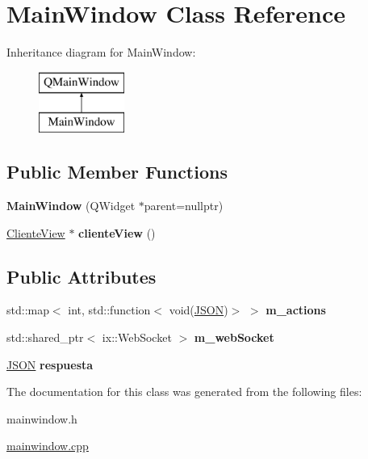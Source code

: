 \hypertarget{classMainWindow}{}\section{Main\+Window Class Reference}
\label{classMainWindow}
Inheritance diagram for Main\+Window\+:\begin{figure}[H]
\begin{center}
\leavevmode
\includegraphics[height=2.000000cm]{classMainWindow}
\end{center}
\end{figure}
\subsection*{Public Member Functions}
\begin{DoxyCompactItemize}
\item 
\mbox{\label{classMainWindow_a996c5a2b6f77944776856f08ec30858d}} 
{\bfseries Main\+Window} (Q\+Widget $\ast$parent=nullptr)
\item 
\mbox{\label{classMainWindow_a61945ee5853009d3409addb1b3d5158d}} 
\mbox{\hyperlink{classClienteView}{Cliente\+View}} $\ast$ {\bfseries cliente\+View} ()
\end{DoxyCompactItemize}
\subsection*{Public Attributes}
\begin{DoxyCompactItemize}
\item 
\mbox{\label{classMainWindow_adbf05482eab51a08599d3a89122638c5}} 
std\+::map$<$ int, std\+::function$<$ void(\mbox{\hyperlink{cliente_8cpp_ab6104b89642419db4e355b7b2e40abbe}{J\+S\+ON}})$>$ $>$ {\bfseries m\+\_\+actions}
\item 
\mbox{\label{classMainWindow_afa2b6b62c93689faa60806203384987a}} 
std\+::shared\+\_\+ptr$<$ ix\+::\+Web\+Socket $>$ {\bfseries m\+\_\+web\+Socket}
\item 
\mbox{\label{classMainWindow_a48223f42354a2ea366a5acb175bef888}} 
\mbox{\hyperlink{cliente_8cpp_ab6104b89642419db4e355b7b2e40abbe}{J\+S\+ON}} {\bfseries respuesta}
\end{DoxyCompactItemize}


The documentation for this class was generated from the following files\+:\begin{DoxyCompactItemize}
\item 
mainwindow.\+h\item 
\mbox{\hyperlink{mainwindow_8cpp}{mainwindow.\+cpp}}\end{DoxyCompactItemize}
